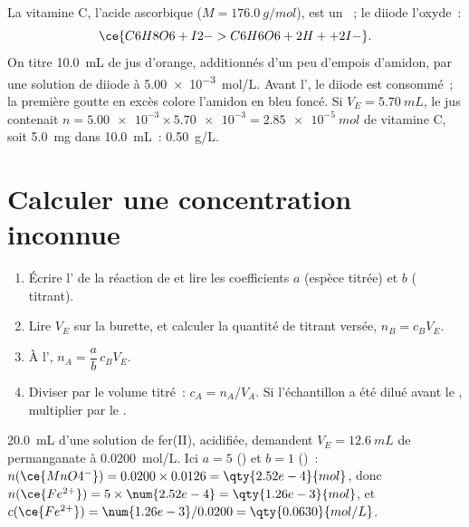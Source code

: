 \begin{example}\label{ex:g11:titration:vitamin-c}
La vitamine C, l'acide ascorbique  ($M = \qty{176.0}{g/mol}$),
est un ~; le diiode  l'oxyde~:
\[
  \ce{C6H8O6 + I2 -> C6H6O6 + 2H+ + 2I-} .
\]
On titre \qty{10.0}{mL} de jus d'orange, additionnés d'un peu d'empois
d'amidon, par une solution de diiode à \qty{5.00e-3}{mol/L}. Avant
l', le diiode est consommé~; la première goutte en excès
colore l'amidon en bleu foncé. Si $V_E = \qty{5.70}{mL}$, le jus
contenait
$n = \num{5.00e-3} \times \num{5.70e-3} = \qty{2.85e-5}{mol}$ de
vitamine C, soit \qty{5.0}{mg} dans \qty{10.0}{mL}~: \qty{0.50}{g/L}.
\end{example}

\section{Calculer une concentration inconnue}

\begin{method}\label{met:g11:titration:computing}
\begin{enumerate}
  \item Écrire l' de la réaction de  et lire les
        coefficients $a$ (espèce titrée) et $b$ ( titrant).
  \item Lire $V_E$ sur la burette, et calculer la quantité de 
        titrant versée, $n_B = c_B V_E$.
  \item À l', $n_A = \dfrac{a}{b}\, c_B V_E$.
  \item Diviser par le volume titré~: $c_A = n_A / V_A$. Si
        l'échantillon a été dilué avant le , multiplier par le
        .
\end{enumerate}
\end{method}

\begin{example}\label{ex:g11:titration:iron}
\qty{20.0}{mL} d'une solution de fer(II), acidifiée, demandent
$V_E = \qty{12.6}{mL}$ de permanganate à \qty{0.0200}{mol/L}. Ici
$a = 5$ () et $b = 1$ ()~:
$n(\ce{MnO4^-}) = 0.0200 \times 0.0126 = \qty{2.52e-4}{mol}$, donc
$n(\ce{Fe^{2+}}) = 5 \times \num{2.52e-4} = \qty{1.26e-3}{mol}$, et
$c(\ce{Fe^{2+}}) = \num{1.26e-3} / 0.0200 = \qty{0.0630}{mol/L}$.
\end{example}

